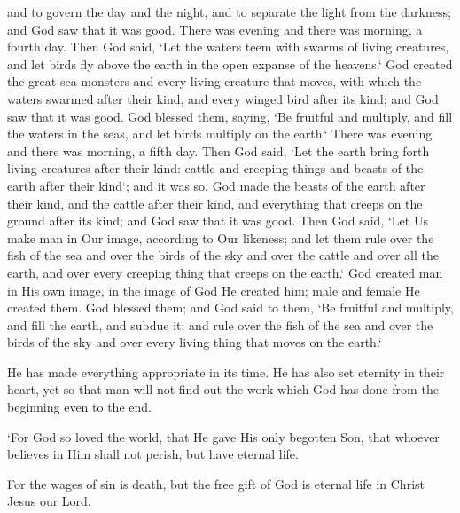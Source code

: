 \begin{scripture}[Genesis 1:18-28]
    and to govern the day and the night, and to separate the light from the darkness; and God saw that it was good.
    There was evening and there was morning, a fourth day.
    Then God said, `Let the waters teem with swarms of living creatures, and let birds fly above the earth in the open expanse of the heavens.`
    God created the great sea monsters and every living creature that moves, with which the waters swarmed after their kind, and every winged bird after its kind; and God saw that it was good.
    God blessed them, saying, `Be fruitful and multiply, and fill the waters in the seas, and let birds multiply on the earth.`
    There was evening and there was morning, a fifth day.
    Then God said, `Let the earth bring forth living creatures after their kind: cattle and creeping things and beasts of the earth after their kind`; and it was so.
    God made the beasts of the earth after their kind, and the cattle after their kind, and everything that creeps on the ground after its kind; and God saw that it was good.
    Then God said, `Let Us make man in Our image, according to Our likeness; and let them rule over the fish of the sea and over the birds of the sky and over the cattle and over all the earth, and over every creeping thing that creeps on the earth.`
    God created man in His own image, in the image of God He created him; male and female He created them.
    God blessed them; and God said to them, `Be fruitful and multiply, and fill the earth, and subdue it; and rule over the fish of the sea and over the birds of the sky and over every living thing that moves on the earth.`
\end{scripture}

\begin{scripture}[Ecclesiastes 3:11]
    He has made everything appropriate in its time. He has also set eternity in their heart, yet so that man will not find out the work which God has done from the beginning even to the end.
\end{scripture}

\begin{scripture}[John 3:16]
    `For God so loved the world, that He gave His only begotten Son, that whoever believes in Him shall not perish, but have eternal life.
\end{scripture}

\begin{scripture}[Romans 6:23]
    For the wages of sin is death, but the free gift of God is eternal life in Christ Jesus our Lord.
\end{scripture}

